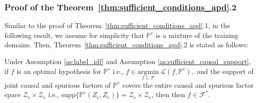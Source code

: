 \subsubsection{Proof of the Theorem~\ref{thm:sufficient_conditions_apd}.2}

Similar to the proof of Theorem~\ref{thm:sufficient_conditions_apd}.1, in the following result, we assume for simplicity that \( \mathbb{P}^e \) is a mixture of the training domains.
Then, Theorem~\ref{thm:sufficient_conditions_apd}.2 is stated as follows:

\begin{theorem}Under Assumption \ref{as:label_idf} and Assumption \ref{as:sufficient_causal_support}, 
if \( f\) is an optimal hypothesis for $\mathbb{P}^{e}$ i.e., $ f \in \underset{f \in \mathcal{F}}{\text{argmin}} \ \mathcal{L}(f, \mathbb{P}^{e}),$ and the support of joint causal and spurious factors of $\mathbb{P}^{e}$ covers the entire causal and spurious factor space $\mathcal{Z}_c\times\mathcal{Z}_e$ i.e., $\text{supp}\{\mathbb{P}^{e} \left (Z_c, Z_e \right )\}=\mathcal{Z}_c\times\mathcal{Z}_e$, then then \( f \in \mathcal{F}^* \).
\end{theorem}

